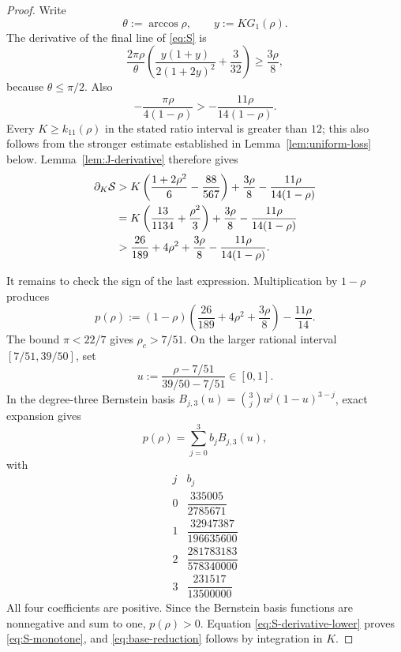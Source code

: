 \documentclass[11pt]{article}
\theoremstyle{remark}
\begin{document}
\begin{proof}
Write
\[
 \theta:=\arccos\rho,\qquad y:=KG_1(\rho).
 \]
The derivative of the final line of \eqref{eq:S} is
\begin{equation}
 \frac{2\pi\rho}{\theta}
 \left(
 \frac{y(1+y)}{2(1+2y)^2}+\frac3{32}
 \right)
 \geq\frac{3\rho}{8},
 \label{eq:endpoint-derivative}
\end{equation}
because \(\theta\leq\pi/2\).  Also
\[
 -\frac{\pi\rho}{4(1-\rho)}
 >-\frac{11\rho}{14(1-\rho)}.
 \]
Every \(K\geq k_{11}(\rho)\) in the stated ratio interval is greater than
\(12\); this also
follows from the stronger estimate established in
Lemma~\ref{lem:uniform-loss} below.  Lemma~\ref{lem:J-derivative}
therefore gives
\begin{align}
 \partial_K\mathcal S
 &>
 K\left(\frac{1+2\rho^2}{6}-\frac{88}{567}\right)
 +\frac{3\rho}{8}
 -\frac{11\rho}{14(1-\rho)}
 \notag\\
 &=
 K\left(\frac{13}{1134}+\frac{\rho^2}{3}\right)
 +\frac{3\rho}{8}
 -\frac{11\rho}{14(1-\rho)}
 \notag\\
 &>
 \frac{26}{189}+4\rho^2+\frac{3\rho}{8}
 -\frac{11\rho}{14(1-\rho)}.
 \label{eq:S-derivative-lower}
\end{align}

It remains to check the sign of the last expression.  Multiplication by
\(1-\rho\) produces
\begin{equation}
 p(\rho):=
 (1-\rho)
 \left(\frac{26}{189}+4\rho^2+\frac{3\rho}{8}\right)
 -\frac{11\rho}{14}.
 \label{eq:p}
\end{equation}
The bound \(\pi<22/7\) gives
\(\rho_c>7/51\).  On the larger rational interval
\([7/51,39/50]\), set
\[
 u:=\frac{\rho-7/51}{39/50-7/51}\in[0,1].
 \]
In the degree-three Bernstein basis
\(B_{j,3}(u)=\binom3j u^j(1-u)^{3-j}\), exact expansion gives
\begin{equation}
 p(\rho)=\sum_{j=0}^3 b_jB_{j,3}(u),
 \label{eq:p-Bernstein}
\end{equation}
with
\begin{equation}
 \begin{array}{c|c}
 j&b_j\\ \hline
 0&\dfrac{335005}{2785671}\\[3pt]
 1&\dfrac{32947387}{196635600}\\[3pt]
 2&\dfrac{281783183}{578340000}\\[3pt]
 3&\dfrac{231517}{13500000}
 \end{array}
 \label{eq:p-coefficients}
\end{equation}
All four coefficients are positive.  Since the Bernstein basis functions
are nonnegative and sum to one, \(p(\rho)>0\).  Equation
\eqref{eq:S-derivative-lower} proves \eqref{eq:S-monotone}, and
\eqref{eq:base-reduction} follows by integration in \(K\).
\end{proof}
\end{document}
